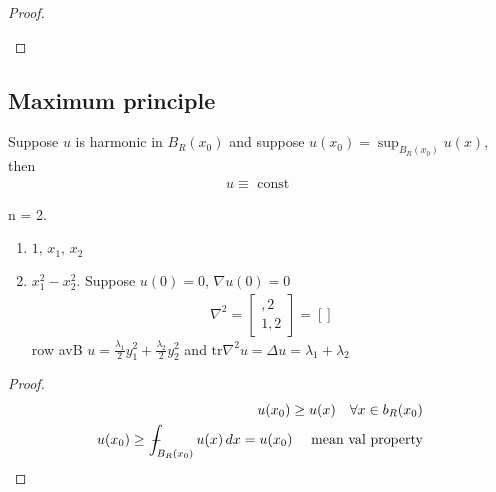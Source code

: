 \documentclass[11pt]{article}
\begin{document}
\begin{proof}
\begin{enumerate}
    \end{enumerate}
\end{proof}

\subsection{Maximum principle}
\begin{lemma}
    Suppose $u$ is harmonic in $B_{R}(x_0)$ and suppose $u(x_0) = \sup_{B_{R}(x_0)}u(x)$, then
    \begin{align*}
        u \equiv \text{ const }
    \end{align*}
\end{lemma}
\begin{example}
    n = 2. 
    \begin{enumerate}
        \item $1,\, x_1,\,x_2$
        \item $x_1^{2} - x_2^{2}$. Suppose $u(0) = 0$, $\nabla u(0) = 0$
        \begin{align*}
            \nabla^{2} = 
            \begin{bmatrix}
                ,2\\
                1,2
            \end{bmatrix}
            =[]
        \end{align*}
        row avB $u = \frac{\lambda_1}{2}y_1^{2} + \frac{\lambda_2}{2}y_2^{2}$ and 
        $\text{tr}\nabla^{2}u = \Delta u = \lambda_1 + \lambda_2$
    \end{enumerate}
\end{example}
\begin{proof}
    \begin{align*}
        u(x_0) \ge u(x) \quad \forall  x \in b_{R}(x_0)\\
        u(x_0) \ge \barint_{B_{R}(x_0)}u(x)\, dx = u(x_0) \quad \text{ mean val property}
    \end{align*}
\end{proof}
\end{document}
